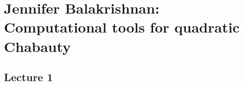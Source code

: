 \newpage
\section{Jennifer Balakrishnan: Computational tools for quadratic Chabauty}
\subsection{Lecture 1}




































 